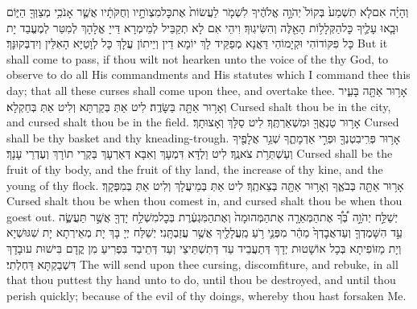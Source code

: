 {וְהָיָ֗ה אִם\maqqaf לֹ֤א תִשְׁמַע֙ בְּקוֹל֙ יְהֹוָ֣ה אֱלֹהֶ֔יךָ לִשְׁמֹ֤ר לַעֲשׂוֹת֙ אֶת\maqqaf כׇּל\maqqaf מִצְוֺתָ֣יו וְחֻקֹּתָ֔יו אֲשֶׁ֛ר אָנֹכִ֥י מְצַוְּךָ֖ הַיּ֑וֹם וּבָ֧אוּ עָלֶ֛יךָ כׇּל\maqqaf הַקְּלָל֥וֹת הָאֵ֖לֶּה וְהִשִּׂיגֽוּךָ׃}
{וִיהֵי אִם לָא תְקַבֵּיל לְמֵימְרָא דַּייָ אֱלָהָךְ לְמִטַּר לְמֶעֱבַד יָת כָּל פִּקּוֹדוֹהִי וּקְיָמוֹהִי דַּאֲנָא מְפַקֵּיד לָךְ יוֹמָא דֵין וְיֵיתוֹן עֲלָךְ כָּל לְוָטַיָּא הָאִלֵּין וְיִדְבְּקוּנָּךְ׃}
{But it shall come to pass, if thou wilt not hearken unto the voice of the \lord\space thy God, to observe to do all His commandments and His statutes which I command thee this day; that all these curses shall come upon thee, and overtake thee.}{}
{אָר֥וּר אַתָּ֖ה בָּעִ֑יר וְאָר֥וּר אַתָּ֖ה בַּשָּׂדֶֽה׃}
{לִיט אַתְּ בְּקַרְתָּא וְלִיט אַתְּ בְּחַקְלָא׃}
{Cursed shalt thou be in the city, and cursed shalt thou be in the field.}{}
{אָר֥וּר טַנְאֲךָ֖ וּמִשְׁאַרְתֶּֽךָ׃}
{לִיט סַלָּךְ וְאָצוּתָךְ׃}
{Cursed shall be thy basket and thy kneading-trough.}{}
{אָר֥וּר פְּרִֽי\maqqaf בִטְנְךָ֖ וּפְרִ֣י אַדְמָתֶ֑ךָ שְׁגַ֥ר אֲלָפֶ֖יךָ וְעַשְׁתְּרֹ֥ת צֹאנֶֽךָ׃}
{לִיט וַלְדָּא דִּמְעָךְ וְאִבָּא דְּאַרְעָךְ בַּקְרֵי תוֹרָךְ וְעֶדְרֵי עָנָךְ׃}
{Cursed shall be the fruit of thy body, and the fruit of thy land, the increase of thy kine, and the young of thy flock.}{}
{אָר֥וּר אַתָּ֖ה בְּבֹאֶ֑ךָ וְאָר֥וּר אַתָּ֖ה בְּצֵאתֶֽךָ׃}
{לִיט אַתְּ בְּמֵיעֲלָךְ וְלִיט אַתְּ בְּמִפְּקָךְ׃}
{Cursed shalt thou be when thou comest in, and cursed shalt thou be when thou goest out.}{}
{יְשַׁלַּ֣ח יְהֹוָ֣ה \pasek  בְּ֠ךָ֠ אֶת\maqqaf הַמְּאֵרָ֤ה אֶת\maqqaf הַמְּהוּמָה֙ וְאֶת\maqqaf הַמִּגְעֶ֔רֶת בְּכׇל\maqqaf מִשְׁלַ֥ח יָדְךָ֖ אֲשֶׁ֣ר תַּעֲשֶׂ֑ה עַ֣ד הִשָּׁמֶדְךָ֤ וְעַד\maqqaf אֲבׇדְךָ֙ מַהֵ֔ר מִפְּנֵ֛י רֹ֥עַ מַֽעֲלָלֶ֖יךָ אֲשֶׁ֥ר עֲזַבְתָּֽנִי׃}
{יְשַׁלַּח יְיָ בָּךְ יָת מְאֵירְתָא יָת שִׁגּוּשְׁיָא וְיָת מַזּוֹפִיתָא בְּכָל אוֹשָׁטוּת יְדָךְ דְּתַעֲבֵיד עַד דְּתִשְׁתֵּיצֵי וְעַד דְּתֵיבַד בִּפְרִיעַ מִן קֳדָם בִּישׁוּת עוּבָדָךְ דִּשְׁבַקְתָּא דַּחְלְתִי׃}
{The \lord\space will send upon thee cursing, discomfiture, and rebuke, in all that thou puttest thy hand unto to do, until thou be destroyed, and until thou perish quickly; because of the evil of thy doings, whereby thou hast forsaken Me.}{}
